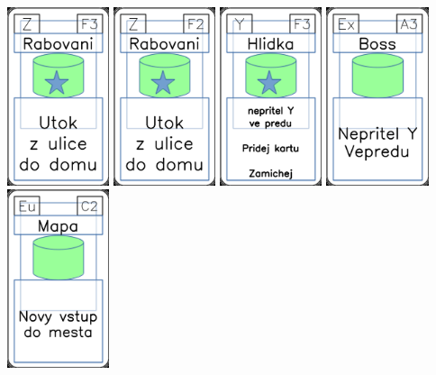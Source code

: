 \documentclass[a4paper]{article}
\begin{document}
	\includegraphics[width=3.0cm]{img-5_57}
	\includegraphics[width=3.0cm]{img-5_56}
	\includegraphics[width=3.0cm]{img-5_27}
	\includegraphics[width=3.0cm]{img-4_2}
	\includegraphics[width=3.0cm]{img-4_41}
\end{document}
